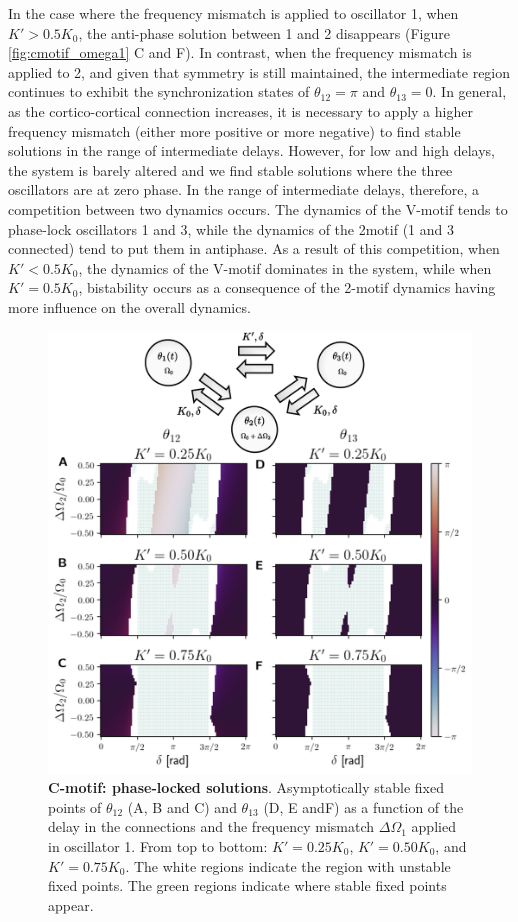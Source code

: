 \documentclass[../main.tex]{subfiles}
\begin{document}
In the case where the frequency mismatch is applied to oscillator 1, when $K' > 0.5K_0$, the anti-phase solution between 1 and 2 disappears (Figure \ref{fig:cmotif_omega1} C and F).
In contrast, when the frequency mismatch is applied to 2, and given that symmetry is still maintained, the intermediate region continues to exhibit the synchronization states of $\theta_{12} = \pi$ and $\theta_{13} = 0$. 
In general, as the cortico-cortical connection increases, it is necessary to apply a higher frequency mismatch (either more positive or more negative) to find stable solutions in the range of intermediate delays.
However, for low and high delays, the system is barely altered and we find stable solutions where the three oscillators are at zero phase.
In the range of intermediate delays, therefore, a competition between two dynamics occurs.
The dynamics of the V-motif tends to phase-lock oscillators 1 and 3, while the dynamics of the 2motif (1 and 3 connected) tend to put them in antiphase.
As a result of this competition, when $K' < 0.5K_0$, the dynamics of the V-motif dominates in the system, while when $K' = 0.5K_0$, bistability occurs as a consequence of the 2-motif dynamics having more influence on the overall dynamics.
\begin{figure}[!htb]
    \centering
    \includegraphics[width=\textwidth]{chapter2/figures/cmotif_different_omega_1_edited.png}
    \caption{\textbf{C-motif: phase-locked solutions}.
    Asymptotically stable fixed points of $\theta_{12}$ (A, B and C) and $\theta_{13}$ (D, E andF) as a function of the delay in the connections and the frequency mismatch $\Delta\Omega_1$ applied in oscillator 1.
    From top to bottom: $K'=0.25K_0$, $K'=0.50K_0$, and $K'=0.75K_0$.
    The white regions indicate the region with unstable fixed points.
    The green regions indicate where stable fixed points appear.}
    \label{fig:cmotif_omega2}
\end{figure}
\end{document}
